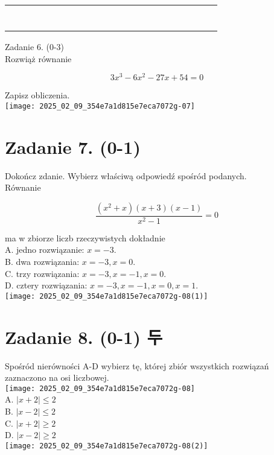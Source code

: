 \documentclass[10pt]{article}
\begin{document}
\begin{center}
\begin{tabular}{|c|c|c|c|c|c|c|c|c|c|c|c|c|c|c|c|c|c|c|c|c|c|}
\hline
 &  &  &  &  &  &  &  &  &  &  &  &  &  &  &  &  &  &  &  &  &  \\
\hline
 &  &  &  &  &  &  &  &  &  &  &  &  &  &  &  &  &  &  &  &  &  \\
\hline
 &  &  &  &  &  &  &  &  &  &  &  &  &  &  &  &  &  &  &  &  &  \\
\hline
 &  &  &  &  &  &  &  &  &  &  &  &  &  &  &  &  &  &  &  &  &  \\
\hline
 &  &  &  &  &  &  &  &  &  &  &  &  &  &  &  &  &  &  &  &  &  \\
\hline
 &  &  &  &  &  &  &  &  &  &  &  &  &  &  &  &  &  &  &  &  &  \\
\hline
 &  &  &  &  &  &  &  &  &  &  &  &  &  &  &  &  &  &  &  &  &  \\
\hline
 &  &  &  &  &  &  &  &  &  &  &  &  &  &  &  &  &  &  &  &  &  \\
\hline
\end{tabular}
\end{center}

Zadanie 6. (0-3)\\
Rozwiąż równanie

\[
3 x^{3}-6 x^{2}-27 x+54=0
\]

Zapisz obliczenia.\\
\texttt{[image: 2025\_02\_09\_354e7a1d815e7eca7072g-07]}

\section*{Zadanie 7. (0-1)}
Dokończ zdanie. Wybierz właściwą odpowiedź spośród podanych.\\
Równanie

\[
\frac{\left(x^{2}+x\right)(x+3)(x-1)}{x^{2}-1}=0
\]

ma w zbiorze liczb rzeczywistych dokładnie\\
A. jedno rozwiązanie: \(x=-3\).\\
B. dwa rozwiązania: \(x=-3, x=0\).\\
C. trzy rozwiązania: \(x=-3, x=-1, x=0\).\\
D. cztery rozwiązania: \(x=-3, x=-1, x=0, x=1\).\\
\texttt{[image: 2025\_02\_09\_354e7a1d815e7eca7072g-08(1)]}

\section*{Zadanie 8. (0-1) 두}
Spośród nierówności A-D wybierz tę, której zbiór wszystkich rozwiązań zaznaczono na osi liczbowej.\\
\texttt{[image: 2025\_02\_09\_354e7a1d815e7eca7072g-08]}\\
A. \(|x+2| \leq 2\)\\
B. \(|x-2| \leq 2\)\\
C. \(|x+2| \geq 2\)\\
D. \(|x-2| \geq 2\)\\
\texttt{[image: 2025\_02\_09\_354e7a1d815e7eca7072g-08(2)]}
\end{document}
